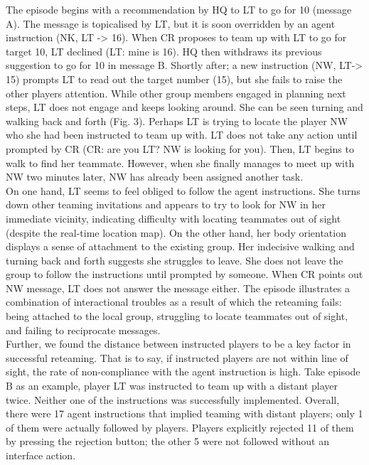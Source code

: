 The episode begins with a recommendation by HQ to LT to go for 10 (message A). The message is topicalised by LT, but it is soon overridden by an agent instruction (NK, LT -> 16). When CR proposes to team up with LT to go for target 10, LT declined (LT: mine is 16). HQ then withdraws its previous suggestion to go for 10 in message B. Shortly after; a new instruction (NW, LT-> 15) prompts LT to read out the target number (15), but she fails to raise the other players attention. While other group members engaged in planning next steps, LT does not engage and keeps looking around. She can be seen turning and walking back and forth (Fig. 3). Perhaps LT is trying to locate the player NW who she had been instructed to team up with. LT does not take any action until prompted by CR (CR: are you LT? NW is looking for you). Then, LT begins to walk to find her teammate. However, when she finally manages to meet up with NW two minutes later, NW has already been assigned another task. \\

On one hand, LT seems to feel obliged to follow the agent instructions. She turns down other teaming invitations and appears to try to look for NW in her immediate vicinity, indicating difficulty with locating teammates out of sight (despite the real-time location map). On the other hand, her body orientation displays a sense of attachment to the existing group. Her indecisive walking and turning back and forth suggests she struggles to leave. She does not leave the group to follow the instructions until prompted by someone. When CR points out NW message, LT does not answer the message either. The episode illustrates a combination of interactional troubles as a result of which the reteaming fails: being attached to the local group, struggling to locate teammates out of sight, and failing to reciprocate messages. \\

Further, we found the distance between instructed players to be a key factor in successful reteaming. That is to say, if instructed players are not within line of sight, the rate of non-compliance with the agent instruction is high. Take episode B as an example, player LT was instructed to team up with a distant player twice. Neither one of the instructions was successfully implemented. Overall, there were 17 agent instructions that implied teaming with distant players; only 1 of them were actually followed by players. Players explicitly rejected 11 of them by pressing the rejection button; the other 5 were not followed without an interface action.\\

